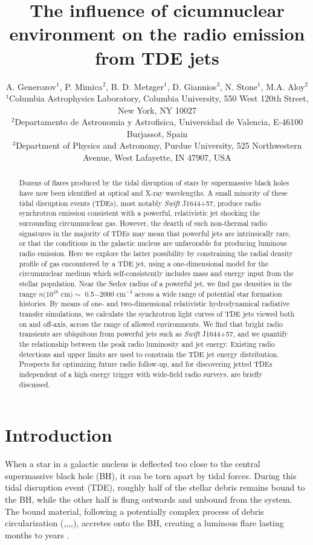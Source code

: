 \documentclass[usenatbib,fleqn]{mnras}
\title[Influence of CNM on TDE radio emission]{The influence of
  cicumnuclear environment on the radio emission from TDE jets}
\author[Generozov et al.]{ A. Generozov$^{1}$, P. Mimica$^{2}$,
  B. D. Metzger$^{1}$, D. Giannios$^{3}$, N. Stone$^{1}$,
  M.A. Aloy$^{2}$
  \\
  $^{1}$Columbia Astrophysics Laboratory, Columbia University, 550 West 120th Street, New York, NY 10027\\
  $^{2}$Departamento de Astronomia y Astrofisica, Universidad de Valencia, E-46100 Burjassot, Spain\\
  $^{3}$Department of Physics and Astronomy, Purdue University, 525
  Northwestern Avenue, West Lafayette, IN 47907, USA}
\begin{document}
\maketitle
\begin{abstract}
Dozens of flares produced by the tidal disruption of stars by supermassive black holes have now been identified at optical and X-ray wavelengths.  A small minority of these tidal disruption events (TDEs), most notably {\it Swift} J1644+57, produce radio synchrotron emission consistent with a powerful, relativistic jet shocking the surrounding circumnuclear gas.  However, the dearth of such non-thermal radio signatures in the majority of TDEs may mean that powerful jets are intrinsically rare, or that the conditions in the galactic nucleus are unfavorable for producing luminous radio emission.  Here we explore the latter possibility by constraining the radial density profile of gas encountered by a TDE jet, using a one-dimensional model for the circumnuclear medium which self-consistently includes mass and energy input from the stellar population.  Near the Sedov radius of a powerful jet, we find gas densities in the range $n(10^{18}$ cm$) \sim$ 0.5$-$2000 cm$^{-3}$ across a wide range of potential star formation histories.  By means of one- and two-dimensional relativistic hydrodynamical radiative transfer simulations, we calculate the synchrotron light curves of TDE jets viewed both on and off-axis, across the range of allowed environments.  We find that bright radio transients are ubiquitous from powerful jets such as {\it Swift} J1644+57, and we quantify the relationship between the peak radio luminosity and jet energy.  Existing radio detections and upper limits are used to constrain the TDE jet energy distribution.  Prospects for optimizing future radio follow-up, and for discovering jetted TDEs independent of a high energy trigger with wide-field radio surveys, are briefly discussed.     
\end{abstract}
\section{Introduction}
\label{sec:intro}
When a star in a galactic nucleus is deflected too close to the
central supermassive black hole (BH), it can be torn apart by tidal
forces.  During this tidal disruption event (TDE), roughly half of the
stellar debris remains bound to the BH, while the other half is flung
outwards and unbound from the system.  The bound material, following a
potentially complex process of debris circularization
(\citealt{Guillochon+2013},\citealt{Hayasaki+2013},\citealt{Hayasaki+2015},\citealt{Shiokawa+2015},\citealt{Bonnerot+2015}),
accretes onto the BH, creating a luminous flare lasting months to
years \citep{Hills1975, Carter+1982, Rees1988}.
\end{document}
